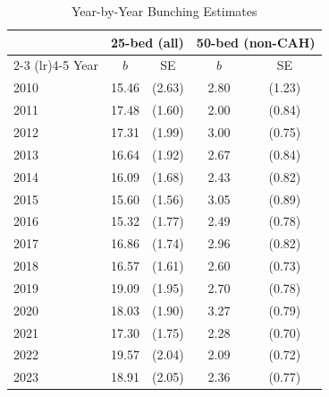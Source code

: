 \begin{table}[t]
\centering
\caption{Year-by-Year Bunching Estimates}
\label{tab:temporal}
\begin{tabular}{lcccc}
\hline\hline
 & \multicolumn{2}{c}{25-bed (all)} & \multicolumn{2}{c}{50-bed (non-CAH)} \\
\cmidrule(lr){2-3} \cmidrule(lr){4-5}
Year & $b$ & SE & $b$ & SE \\
\hline
2010 & 15.46 & (2.63) & 2.80 & (1.23) \\
2011 & 17.48 & (1.60) & 2.00 & (0.84) \\
2012 & 17.31 & (1.99) & 3.00 & (0.75) \\
2013 & 16.64 & (1.92) & 2.67 & (0.84) \\
2014 & 16.09 & (1.68) & 2.43 & (0.82) \\
2015 & 15.60 & (1.56) & 3.05 & (0.89) \\
2016 & 15.32 & (1.77) & 2.49 & (0.78) \\
2017 & 16.86 & (1.74) & 2.96 & (0.82) \\
2018 & 16.57 & (1.61) & 2.60 & (0.73) \\
2019 & 19.09 & (1.95) & 2.70 & (0.78) \\
2020 & 18.03 & (1.90) & 3.27 & (0.79) \\
2021 & 17.30 & (1.75) & 2.28 & (0.70) \\
2022 & 19.57 & (2.04) & 2.09 & (0.72) \\
2023 & 18.91 & (2.05) & 2.36 & (0.77) \\
\hline\hline
\end{tabular}
\par{}
\end{table}

